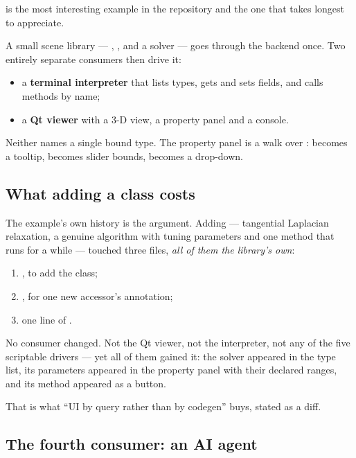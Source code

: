  is the most interesting example in the repository and
the one that takes longest to appreciate.

A small scene library --- , , and a  solver
--- goes through the  backend once. Two entirely separate
consumers then drive it:

\begin{itemize}
  \item a \textbf{terminal interpreter} that lists types, gets and sets fields,
    and calls methods by name;
  \item a \textbf{Qt viewer} with a 3-D view, a property panel and a console.
\end{itemize}

Neither names a single bound type. The property panel is a walk over
:  becomes a tooltip,  becomes slider
bounds,  becomes a drop-down.

\subsection*{What adding a class costs}

The example's own history is the argument. Adding  ---
tangential Laplacian relaxation, a genuine algorithm with tuning parameters and
one method that runs for a while --- touched three files, \emph{all of them the
library's own}:

\begin{enumerate}
  \item {}, to add the class;
  \item {}, for one new accessor's annotation;
  \item one line of .
\end{enumerate}

No consumer changed. Not the Qt viewer, not the interpreter, not any of the five
scriptable drivers --- yet all of them gained it: the solver appeared in the
type list, its parameters appeared in the property panel with their declared
ranges, and its method appeared as a button.

That is what ``UI by query rather than by codegen'' buys, stated as a diff.

\subsection*{The fourth consumer: an AI agent}

